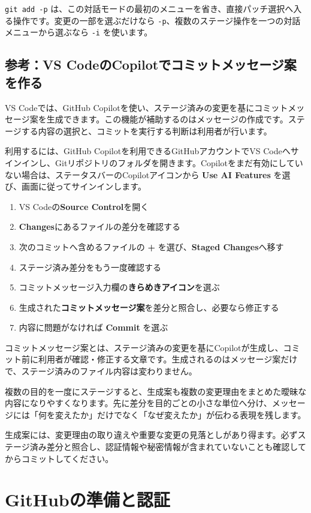 \documentclass[a4paper,11pt]{jlreq}
\newcommand{\cmd}[1]{\texttt{#1}}
\newcommand{\term}[1]{\textbf{#1}}
\begin{document}
\cmd{git add -p} は、この対話モードの最初のメニューを省き、直接パッチ選択へ入る操作です。変更の一部を選ぶだけなら \cmd{-p}、複数のステージ操作を一つの対話メニューから選ぶなら \cmd{-i} を使います。

\subsection{参考：VS CodeのCopilotでコミットメッセージ案を作る}

VS Codeでは、GitHub Copilotを使い、ステージ済みの変更を基にコミットメッセージ案を生成できます。この機能が補助するのはメッセージの作成です。ステージする内容の選択と、コミットを実行する判断は利用者が行います。

利用するには、GitHub Copilotを利用できるGitHubアカウントでVS Codeへサインインし、Gitリポジトリのフォルダを開きます。Copilotをまだ有効にしていない場合は、ステータスバーのCopilotアイコンから \term{Use AI Features} を選び、画面に従ってサインインします。

\begin{enumerate}
  \item VS Codeの\term{Source Control}を開く
  \item \term{Changes}にあるファイルの差分を確認する
  \item 次のコミットへ含めるファイルの \term{+} を選び、\term{Staged Changes}へ移す
  \item ステージ済み差分をもう一度確認する
  \item コミットメッセージ入力欄の\term{きらめきアイコン}を選ぶ
  \item 生成された\term{コミットメッセージ案}を差分と照合し、必要なら修正する
  \item 内容に問題がなければ \term{Commit} を選ぶ
\end{enumerate}

コミットメッセージ案とは、ステージ済みの変更を基にCopilotが生成し、コミット前に利用者が確認・修正する文章です。生成されるのはメッセージ案だけで、ステージ済みのファイル内容は変わりません。

複数の目的を一度にステージすると、生成案も複数の変更理由をまとめた曖昧な内容になりやすくなります。先に差分を目的ごとの小さな単位へ分け、メッセージには「何を変えたか」だけでなく「なぜ変えたか」が伝わる表現を残します。

生成案には、変更理由の取り違えや重要な変更の見落としがあり得ます。必ずステージ済み差分と照合し、認証情報や秘密情報が含まれていないことも確認してからコミットしてください。

\section{GitHubの準備と認証}
\end{document}

